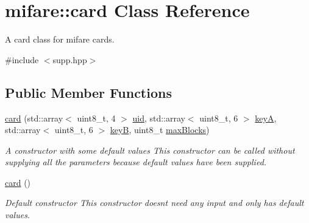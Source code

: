 \hypertarget{classmifare_1_1card}{}\section{mifare\+:\+:card Class Reference}
\label{classmifare_1_1card}


A card class for mifare cards.  




{\ttfamily \#include $<$supp.\+hpp$>$}

\subsection*{Public Member Functions}
\begin{DoxyCompactItemize}
\item 
\mbox{\label{classmifare_1_1card_add87ee9228a95ef57e6778e837a5fa68}} 
\hyperlink{classmifare_1_1card_add87ee9228a95ef57e6778e837a5fa68}{card} (std\+::array$<$ uint8\+\_\+t, 4 $>$ \hyperlink{classmifare_1_1card_a0f97900bf64b956ac9f9622671aa4f74}{uid}, std\+::array$<$ uint8\+\_\+t, 6 $>$ \hyperlink{classmifare_1_1card_a9d6bb609c82ca6fa65a79e83656db964}{keyA}, std\+::array$<$ uint8\+\_\+t, 6 $>$ \hyperlink{classmifare_1_1card_ae99191bf1a9478b61f4b0043c6e0d7bf}{keyB}, uint8\+\_\+t \hyperlink{classmifare_1_1card_a3283a205a271075bd6e4b0bea3f015cb}{max\+Blocks})
\begin{DoxyCompactList}\small\item\em A constructor with some default values  This constructor can be called without supplying all the parameters because default values have been supplied. \end{DoxyCompactList}\item 
\mbox{\label{classmifare_1_1card_aff06c5ecc67800474ee8f3e76d4bf1f4}} 
\hyperlink{classmifare_1_1card_aff06c5ecc67800474ee8f3e76d4bf1f4}{card} ()
\begin{DoxyCompactList}\small\item\em Default constructor  This constructor doesn\textquotesingle{}t need any input and only has default values. \end{DoxyCompactList}\end{DoxyCompactItemize}
